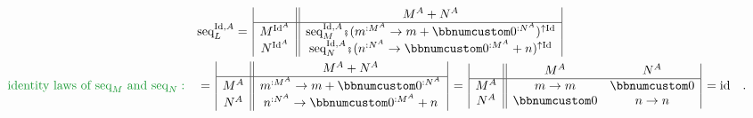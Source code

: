 \begin{align*}
 & \text{seq}_{L}^{\text{Id},A}=\,\begin{array}{|c||c|}
 & M^{A}+N^{A}\\
\hline M^{\text{Id}^{A}} & \text{seq}_{M}^{\text{Id},A}\bef(m^{:M^{A}}\rightarrow m+\bbnum 0^{:N^{A}})^{\uparrow\text{Id}}\\
N^{\text{Id}^{A}} & \text{seq}_{N}^{\text{Id},A}\bef(n^{:N^{A}}\rightarrow\bbnum 0^{:M^{A}}+n)^{\uparrow\text{Id}}
\end{array}\\
{\color{greenunder}\text{identity laws of }\text{seq}_{M}\text{ and }\text{seq}_{N}:}\quad & =\,\begin{array}{|c||c|}
 & M^{A}+N^{A}\\
\hline M^{A} & m^{:M^{A}}\rightarrow m+\bbnum 0^{:N^{A}}\\
N^{A} & n^{:N^{A}}\rightarrow\bbnum 0^{:M^{A}}+n
\end{array}\,=\,\begin{array}{|c||cc|}
 & M^{A} & N^{A}\\
\hline M^{A} & m\rightarrow m & \bbnum 0\\
N^{A} & \bbnum 0 & n\rightarrow n
\end{array}\,=\text{id}\quad.
\end{align*}

